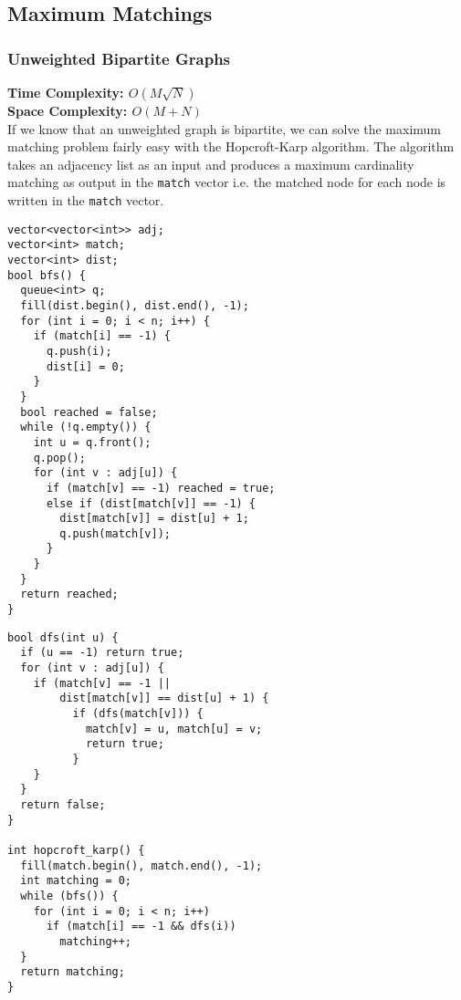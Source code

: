 \newpage

\subsection{Maximum Matchings}
\subsubsection{Unweighted Bipartite Graphs}
\textbf{Time Complexity: $O(M\sqrt{N})$}\\
\textbf{Space Complexity: $O(M + N)$}\\

If we know that an unweighted graph is bipartite, we can solve the maximum matching problem
fairly easy with the Hopcroft-Karp algorithm. \cite{Hopcroft2006Jul}
The algorithm takes an adjacency list as an input and 
produces a maximum cardinality matching as output
in the \lstinline{match} vector i.e. 
the matched node for each node is written
in the \lstinline{match} vector.


\begin{center}
\begin{minipage}[t]{0.45\linewidth}
\begin{lstlisting}
vector<vector<int>> adj;
vector<int> match;
vector<int> dist;
bool bfs() {
  queue<int> q;
  fill(dist.begin(), dist.end(), -1);
  for (int i = 0; i < n; i++) {
    if (match[i] == -1) {
      q.push(i);
      dist[i] = 0;
    }
  }
  bool reached = false;
  while (!q.empty()) {
    int u = q.front();
    q.pop();
    for (int v : adj[u]) {
      if (match[v] == -1) reached = true;
      else if (dist[match[v]] == -1) {
        dist[match[v]] = dist[u] + 1;
        q.push(match[v]);
      }
    }
  }
  return reached;
}
\end{lstlisting}
\end{minipage}
\qquad
\begin{minipage}[t]{0.45\linewidth}
\begin{lstlisting}
bool dfs(int u) {
  if (u == -1) return true;
  for (int v : adj[u]) {
    if (match[v] == -1 || 
        dist[match[v]] == dist[u] + 1) {
          if (dfs(match[v])) {
            match[v] = u, match[u] = v;
            return true;
          }
    }
  }
  return false;
}

int hopcroft_karp() {
  fill(match.begin(), match.end(), -1);
  int matching = 0;
  while (bfs()) {
    for (int i = 0; i < n; i++)
      if (match[i] == -1 && dfs(i))
        matching++;
  }
  return matching;
}
\end{lstlisting}
\end{minipage}
\end{center}

